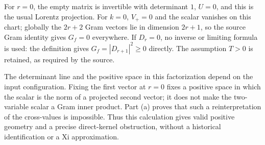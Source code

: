 For \(r=0\), the empty matrix is invertible with determinant \(1\),
\(U=0\), and this is the usual Lorentz projection.
For \(k=0\), \(V_+=0\) and the scalar vanishes on this chart;
globally the \(2r+2\) Gram vectors lie in dimension \(2r+1\), so
the source Gram identity gives \(G_f=0\) everywhere.
If \(D_r=0\), no inverse or limiting formula is used:
the definition gives \(G_f=|D_{r+1}|^2\ge0\) directly.
The assumption \(T>0\) is retained, as required by the source.

The determinant line and the positive space in this factorization
depend on the input configuration. Fixing the first vector at \(r=0\)
fixes a positive space in which the scalar is the norm of a projected
second vector; it does not make the two-variable scalar a Gram
inner product. Part (a) proves that such a reinterpretation of the
cross-values is impossible. Thus this calculation gives valid positive
geometry and a precise direct-kernel obstruction, without a historical
identification or a Xi approximation.
